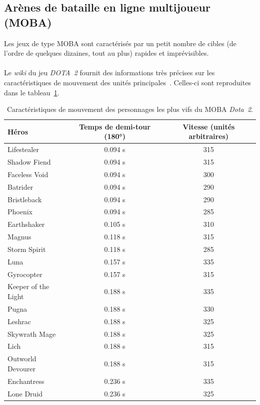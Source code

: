 	\subsection{Arènes de bataille en ligne multijoueur (MOBA)}
	Les jeux de type MOBA sont caractérisés par un petit nombre de cibles (de l'ordre de quelques dizaines, tout au plus) rapides et imprévisibles.

	\paragraph*{}
	Le \emph{wiki} du jeu \emph{DOTA~2} fournit des informations très précises sur les caractéristiques de mouvement des unités principales~\cite{dota2}.	 Celles-ci sont reproduites dans le tableau~\ref{tab:dotamoves}.
	
	\newcommand{\newrow}{\bigstrut[t] \\ \hline}
	\begin{table}[ht]
		\centering
		\begin{tabular}{ p{} c c }
		Héros				&	Temps de demi-tour (180°)	&	Vitesse (unités arbitraires)	\newrow
		Lifestealer		&	0.094 s				&	315						\newrow
		Shadow Fiend		&	0.094 s				&	315						\newrow
		Faceless Void		&	0.094 s				&	300						\newrow
		Batrider			&	0.094 s				&	290						\newrow
		Bristleback		&	0.094 s				&	290						\newrow
		Phoenix			&	0.094 s				&	285						\newrow
		Earthshaker		&	0.105 s				&	310						\newrow
		Magnus			&	0.118 s				&	315						\newrow
		Storm Spirit		&	0.118 s				&	285						\newrow
		Luna				&	0.157 s				&	335						\newrow
		Gyrocopter			&	0.157 s				&	315						\newrow
		Keeper of the Light	&	0.188 s				&	335						\newrow
		Pugna				&	0.188 s				&	330						\newrow
		Leshrac			&	0.188 s				&	325						\newrow
		Skywrath Mage		&	0.188 s				&	325						\newrow
		Lich				&	0.188 s				&	315						\newrow
		Outworld Devourer	&	0.188 s				&	315						\newrow
		Enchantress		&	0.236 s				&	335						\newrow
		Lone Druid			&	0.236 s				&	325						\bigstrut[t] \\
		\end{tabular}
		\caption{Caractéristiques de mouvement des personnages les plus vifs du MOBA \emph{Dota~2}.}
		\label{tab:dotamoves}
	\end{table}
	
